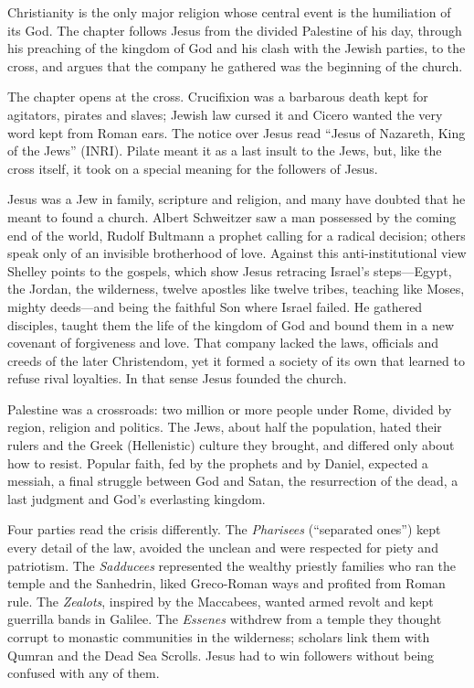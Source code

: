 
\begin{inbrief}
Christianity is the only major religion whose central event is the humiliation of its God. The chapter
follows Jesus from the divided Palestine of his day, through his preaching of the kingdom of God and
his clash with the Jewish parties, to the cross, and argues that the company he gathered was the
beginning of the church.
\end{inbrief}

The chapter opens at the cross. Crucifixion was a barbarous death kept for agitators, pirates and
slaves; Jewish law cursed it and Cicero wanted the very word kept from Roman ears. The notice over
Jesus read ``Jesus of Nazareth, King of the Jews'' (INRI). Pilate meant it as a last insult to the
Jews, but, like the cross itself, it took on a special meaning for the followers of Jesus.

Jesus was a Jew in family, scripture and religion, and many have doubted that he meant to found a
church. Albert Schweitzer saw a man possessed by the coming end of the world, Rudolf Bultmann a prophet
calling for a radical decision; others speak only of an invisible brotherhood of love. Against this
anti-institutional view Shelley points to the gospels, which show Jesus retracing Israel's steps---Egypt, the Jordan, the wilderness, twelve apostles like twelve tribes, teaching like Moses, mighty
deeds---and being the faithful Son where Israel failed. He gathered disciples, taught them the life
of the kingdom of God and bound them in a new covenant of forgiveness and love. That company lacked the
laws, officials and creeds of the later Christendom, yet it formed a society of its own that learned to refuse
rival loyalties. In that sense Jesus founded the church.

Palestine was a crossroads: two million or more people under Rome, divided by region, religion and
politics. The Jews, about half the population, hated their rulers and the Greek (Hellenistic) culture
they brought, and differed only about how to resist. Popular faith, fed by the prophets and by Daniel,
expected a messiah, a final struggle between God and Satan, the resurrection of the dead, a last
judgment and God's everlasting kingdom.

Four parties read the crisis differently. The \emph{Pharisees} (``separated ones'') kept every detail
of the law, avoided the unclean and were respected for piety and patriotism. The \emph{Sadducees}
represented the wealthy priestly families who ran the temple and the Sanhedrin, liked Greco-Roman ways
and profited from Roman rule. The \emph{Zealots}, inspired by the Maccabees, wanted armed revolt and
kept guerrilla bands in Galilee. The \emph{Essenes} withdrew from a temple they thought corrupt to
monastic communities in the wilderness; scholars link them with Qumran and the Dead Sea Scrolls. Jesus
had to win followers without being confused with any of them.

